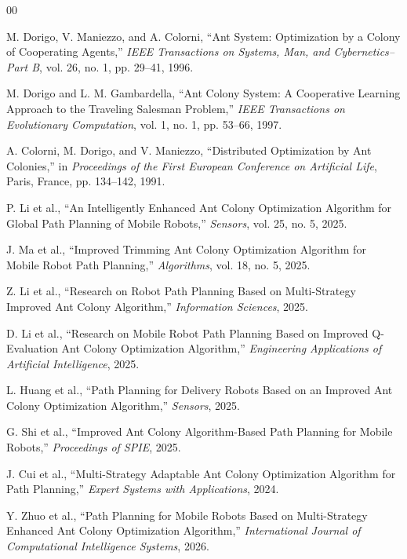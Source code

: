 \documentclass[conference]{IEEEtran}
\begin{document}
\begin{thebibliography}{00}

M. Dorigo, V. Maniezzo, and A. Colorni,
``Ant System: Optimization by a Colony of Cooperating Agents,''
\textit{IEEE Transactions on Systems, Man, and Cybernetics--Part B},
vol. 26, no. 1, pp. 29--41, 1996.

M. Dorigo and L. M. Gambardella,
``Ant Colony System: A Cooperative Learning Approach to the Traveling Salesman Problem,''
\textit{IEEE Transactions on Evolutionary Computation},
vol. 1, no. 1, pp. 53--66, 1997.

A. Colorni, M. Dorigo, and V. Maniezzo,
``Distributed Optimization by Ant Colonies,''
in \textit{Proceedings of the First European Conference on Artificial Life},
Paris, France, pp. 134--142, 1991.


P. Li et al.,
``An Intelligently Enhanced Ant Colony Optimization Algorithm for Global Path Planning of Mobile Robots,''
\textit{Sensors},
vol. 25, no. 5, 2025.

J. Ma et al.,
``Improved Trimming Ant Colony Optimization Algorithm for Mobile Robot Path Planning,''
\textit{Algorithms},
vol. 18, no. 5, 2025.

Z. Li et al.,
``Research on Robot Path Planning Based on Multi-Strategy Improved Ant Colony Algorithm,''
\textit{Information Sciences},
2025.

D. Li et al.,
``Research on Mobile Robot Path Planning Based on Improved Q-Evaluation Ant Colony Optimization Algorithm,''
\textit{Engineering Applications of Artificial Intelligence},
2025.

L. Huang et al.,
``Path Planning for Delivery Robots Based on an Improved Ant Colony Optimization Algorithm,''
\textit{Sensors},
2025.

G. Shi et al.,
``Improved Ant Colony Algorithm-Based Path Planning for Mobile Robots,''
\textit{Proceedings of SPIE},
2025.

J. Cui et al.,
``Multi-Strategy Adaptable Ant Colony Optimization Algorithm for Path Planning,''
\textit{Expert Systems with Applications},
2024.

Y. Zhuo et al.,
``Path Planning for Mobile Robots Based on Multi-Strategy Enhanced Ant Colony Optimization Algorithm,''
\textit{International Journal of Computational Intelligence Systems},
2026.


\end{thebibliography}
\end{document}
